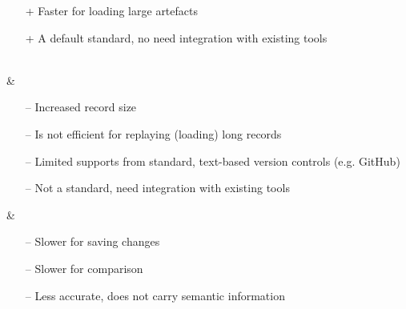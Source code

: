 \begin{table*}[h]
\begin{scriptsize}
\begin{tabular}
\begin{minipage}[t]{5cm}
\begin{itemize}[leftmargin=9pt]
          \item[+] Faster for loading large artefacts \cite{DBLP:conf/models/Espinazo-PaganCM11,daniel2016neoemf,eclipse2019cdo}
          \item[+] A default standard, no need integration with existing tools \cite{koegel2010emfstore}  
        \end{itemize}
      \end{minipage}
      \\
      \hline
       & \begin{minipage}[t]{5cm}
        \raggedright
        \begin{itemize}[leftmargin=9pt]
          \setlength\itemsep{2pt}
          \item[--] Increased record size \cite{DBLP:journals/entcs/RobbesL07,DBLP:conf/edoc/KoegelHLHD10}
          \item[--] Is not efficient for replaying (loading) long records \cite{mens2002state}
          \item[--] Limited supports from standard, text-based version controls (e.g. GitHub) \cite{koegel2010emfstore} 
          \item[--] Not a standard, need integration with existing tools \cite{koegel2010emfstore} 
        \end{itemize}
      \end{minipage}
      & 
      \begin{minipage}[t]{5cm}
        \raggedright
        \begin{itemize}[leftmargin=9pt]
          \setlength\itemsep{2pt}
          \item[--] Slower for saving changes  \cite{mens2002state,daniel2016neoemf,DBLP:conf/models/Espinazo-PaganCM11}
          \item[--] Slower for comparison \cite{DBLP:conf/edoc/KoegelHLHD10}
          \item[--] Less accurate, does not carry semantic information \cite{mens2002state,DBLP:conf/edoc/KoegelHLHD10}  
        \end{itemize}
      \end{minipage}
      \\
      \hline
    \end{tabular} 
  \end{scriptsize}
\end{table*}

